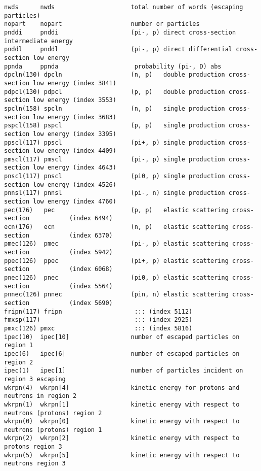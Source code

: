 \begin{verbatim}
nwds      nwds                     total number of words (escaping particles) 
nopart    nopart                   number or particles
pnddi     pnddi                    (pi-, p) direct cross-section intermediate energy
pnddl     pnddl                    (pi-, p) direct differential cross-section low energy  
ppnda     ppnda                     probability (pi-, D) abs 
dpcln(130) dpcln                   (n, p)   double production cross-section low energy (index 3841)
pdpcl(130) pdpcl                   (p, p)   double production cross-section low energy (index 3553) 
spcln(158) spcln                   (n, p)   single production cross-section low energy (index 3683)
pspcl(158) pspcl                   (p, p)   single production cross-section low energy (index 3395)
ppscl(117) ppscl                   (pi+, p) single production cross-section low energy (index 4409)
pmscl(117) pmscl                   (pi-, p) single production cross-section low energy (index 4643) 
pnscl(117) pnscl                   (pi0, p) single production cross-section low energy (index 4526)
pnnsl(117) pnnsl                   (pi-, n) single production cross-section low energy (index 4760)
pec(176)   pec                     (p, p)   elastic scattering cross-section           (index 6494)
ecn(176)   ecn                     (n, p)   elastic scattering cross-section           (index 6370)
pmec(126)  pmec                    (pi-, p) elastic scattering cross-section           (index 5942) 
ppec(126)  ppec                    (pi+, p) elastic scattering cross-section           (index 6068)
pnec(126)  pnec                    (pi0, p) elastic scattering cross-section           (index 5564)
pnnec(126) pnnec                   (pin, n) elastic scattering cross-section           (index 5690)
fripn(117) fripn                    ::: (index 5112)
fmxsp(117)                          ::: (index 2925)
pmxc(126) pmxc                      ::: (index 5816)
ipec(10)  ipec[10]                 number of escaped particles on region 1 
ipec(6)   ipec[6]                  number of escaped particles on region 2 
ipec(1)   ipec[1]                  number of particles incident on region 3 escaping 
wkrpn(4)  wkrpn[4]                 kinetic energy for protons and neutrons in region 2 
wkrpn(1)  wkrpn[1]                 kinetic energy with respect to neutrons (protons) region 2 
wkrpn(0)  wkrpn[0]                 kinetic energy with respect to neutrons (protons) region 1 
wkrpn(2)  wkrpn[2]                 kinetic energy with respect to protons region 3 
wkrpn(5)  wkrpn[5]                 kinetic energy with respect to neutrons region 3 

\end{verbatim}
